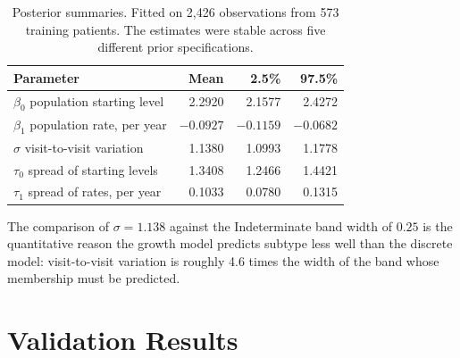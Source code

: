 \documentclass[11pt,a4paper]{article}
\begin{document}
\begin{table}[H]
\centering
\begin{tabular}{@{}lrrr@{}}
\toprule
\textbf{Parameter} & \textbf{Mean} & \textbf{2.5\%} & \textbf{97.5\%} \\
\midrule
$\beta_0$ \; population starting level      & 2.2920 & 2.1577 & 2.4272 \\
$\beta_1$ \; population rate, per year      & $-0.0927$ & $-0.1159$ & $-0.0682$ \\
$\sigma$ \; visit-to-visit variation        & 1.1380 & 1.0993 & 1.1778 \\
$\tau_0$ \; spread of starting levels       & 1.3408 & 1.2466 & 1.4421 \\
$\tau_1$ \; spread of rates, per year       & 0.1033 & 0.0780 & 0.1315 \\
\bottomrule
\end{tabular}
\caption{Posterior summaries. Fitted on 2{,}426 observations from 573 training
patients. The estimates were stable across five different prior specifications.}
\end{table}

\noindent
The comparison of $\sigma = 1.138$ against the Indeterminate band width of
$0.25$ is the quantitative reason the growth model predicts subtype less well
than the discrete model: visit-to-visit variation is roughly 4.6 times the width
of the band whose membership must be predicted.

\section{Validation Results}
\end{document}
